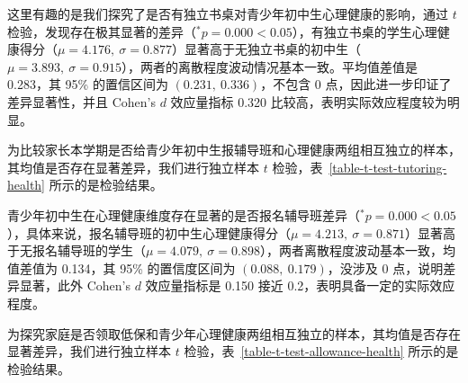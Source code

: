 \documentclass[zihao = -4, linespread = 1.5]{article}
\begin{document}
这里有趣的是我们探究了是否有独立书桌对青少年初中生心理健康的影响，通过 $t$ 检验，发现存在极其显著的差异（$^{\bm{*}}p=0.000<0.05$），有独立书桌的学生心理健康得分（$\mu=4.176,\ \sigma=0.877$）显著高于无独立书桌的初中生（$\mu=3.893,\ \sigma=0.915$），两者的离散程度波动情况基本一致。平均值差值是 0.283，其 95\% 的置信区间为 $(0.231,\ 0.336)$，不包含 0 点，因此进一步印证了差异显著性，并且 Cohen's $d$ 效应量指标 0.320 比较高，表明实际效应程度较为明显。

为比较家长本学期是否给青少年初中生报辅导班和心理健康两组相互独立的样本，其均值是否存在显著差异，我们进行独立样本 $t$ 检验，表~\ref{table-t-test-tutoring-health} 所示的是检验结果。

\begin{table}[htbp]
    \centering
    \setlength{\tabcolsep}{5pt}
    \renewcommand{\arraystretch}{1.5}
    \caption{学生是否报名辅导班与心理健康的独立性样本 $t$ 检验结果}\label{table-t-test-tutoring-health}
\end{table}

青少年初中生在心理健康维度存在显著的是否报名辅导班差异（$^{\bm{*}}p=0.000<0.05$），具体来说，报名辅导班的初中生心理健康得分（$\mu=4.213,\ \sigma=0.871$）显著高于无报名辅导班的学生（$\mu=4.079,\ \sigma=0.898$），两者离散程度波动基本一致，均值差值为 0.134，其 95\% 的置信度区间为 $(0.088,\ 0.179)$，没涉及 0 点，说明差异显著，此外 Cohen's $d$ 效应量指标是 0.150 接近 0.2，表明具备一定的实际效应程度。

为探究家庭是否领取低保和青少年心理健康两组相互独立的样本，其均值是否存在显著差异，我们进行独立样本 $t$ 检验，表~\ref{table-t-test-allowance-health} 所示的是检验结果。
\end{document}
